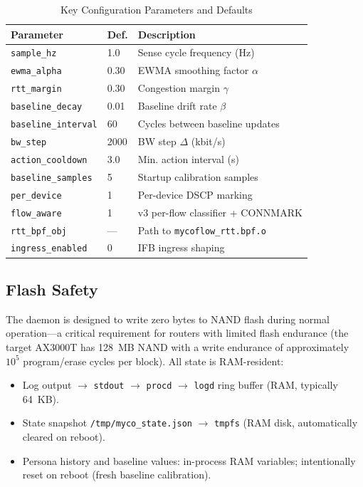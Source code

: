 \documentclass[conference]{IEEEtran}
\begin{document}
\begin{table}[t]
\caption{Key Configuration Parameters and Defaults}
\label{tab:cfg}
\centering
\small
{\setlength{\tabcolsep}{2pt}\scriptsize
\begin{tabular}{p{2.5cm}p{0.7cm}p{4.4cm}}
\toprule
\textbf{Parameter} & \textbf{Def.} & \textbf{Description} \\
\midrule
\texttt{sample\_hz}         & 1.0  & Sense cycle frequency (Hz) \\
\texttt{ewma\_alpha}        & 0.30 & EWMA smoothing factor $\alpha$ \\
\texttt{rtt\_margin}        & 0.30 & Congestion margin $\gamma$ \\
\texttt{baseline\_decay}    & 0.01 & Baseline drift rate $\beta$ \\
\texttt{baseline\_interval} & 60   & Cycles between baseline updates \\
\texttt{bw\_step}           & 2000 & BW step $\Delta$ (kbit/s) \\
\texttt{action\_cooldown}   & 3.0  & Min. action interval (s) \\
\texttt{baseline\_samples}  & 5    & Startup calibration samples \\
\texttt{per\_device}        & 1    & Per-device DSCP marking \\
\texttt{flow\_aware}        & 1    & v3 per-flow classifier + CONNMARK \\
\texttt{rtt\_bpf\_obj}      & ---  & Path to \texttt{mycoflow\_rtt.bpf.o} \\
\texttt{ingress\_enabled}   & 0    & IFB ingress shaping \\
\bottomrule
\end{tabular}}
\end{table}

\subsection{Flash Safety}

The daemon is designed to write zero bytes to NAND flash during normal
operation—a critical requirement for routers with limited flash endurance
(the target AX3000T has 128~MB NAND with a write endurance of
approximately $10^5$ program/erase cycles per block).
All state is RAM-resident:
\begin{itemize}
  \item Log output $\to$ \texttt{stdout} $\to$ \texttt{procd} $\to$
    \texttt{logd} ring buffer (RAM, typically 64~KB).
  \item State snapshot \texttt{/tmp/myco\_state.json} $\to$
    \texttt{tmpfs} (RAM disk, automatically cleared on reboot).
  \item Persona history and baseline values: in-process RAM variables;
    intentionally reset on reboot (fresh baseline calibration).
\end{itemize}
\end{document}

